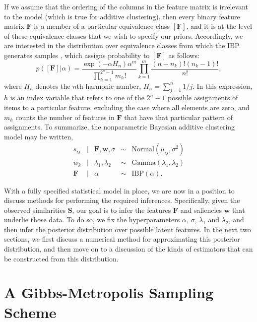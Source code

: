 \documentclass[11pt]{article}
\newcommand{\condon}{|}
\newcommand{\presec}{}
\newcommand{\postsec}{}
\begin{document}
If we assume that the ordering of the columns in the feature matrix is irrelevant to the model (which is true for additive clustering), then every binary feature matrix $\mathbf{F}$ is a member of a particular equivalence class $[\mathbf{F}]$, and it is at the level of these equivalence classes that we wish to specify our priors. Accordingly, we are interested in the distribution over equivalence classes from which the IBP generates samples \cite{griffithsg05}, which assigns probability to $[\mathbf{F}]$ as follows:
\begin{equation}
p([\mathbf{F}] \condon \alpha) = \frac{ \exp \left(- \alpha H_n \right) \alpha^m}{\prod_{h=1}^{2^n-1} m_h!} \prod_{k=1}^{m} \frac{(n-n_k)! (n_k-1)!}{n!},
\end{equation}
where $H_n$ denotes the $n$th harmonic number, $H_n = \sum_{j=1}^n 1/j$. In this expression, $h$ is an index variable that refers to one of the $2^n-1$ possible assignments of items to a particular feature, excluding the case where all elements are zero, and $m_h$ counts the number of features in $\mathbf{F}$ that have that particular pattern of assignments. To summarize, the nonparametric Bayesian additive clustering model may be written,
    \begin{equation}
    \begin{array}{rclcl}
    s_{ij} & \condon & \mathbf{F},\mathbf{w},\sigma &\sim &\mbox{Normal}(\mu_{ij},\sigma^2) \\
    w_k & \condon & \lambda_1, \lambda_2 & \sim & \mbox{Gamma}(\lambda_1, \lambda_2) \\
    \mathbf{F} & \condon & \alpha & \sim & \mbox{IBP}(\alpha).
    \end{array}
    \label{fullmodel}
    \end{equation}

With a fully specified statistical model in place, we are now in a position to discuss methods for performing the required inferences. Specifically, given the observed similarities $\mathbf{S}$, our goal is to infer the features $\mathbf{F}$ and saliencies $\mathbf{w}$ that underlie those data. To do so, we fix the hyperparameters $\alpha$, $\sigma$, $\lambda_1$ and $\lambda_2$, and then infer the posterior distribution over possible latent features. In the next two sections, we first discuss a numerical method for approximating this posterior distribution, and then move on to a discussion of the kinds of estimators that can be constructed from this distribution.

\presec \section{A Gibbs-Metropolis Sampling Scheme} \postsec
\end{document}
